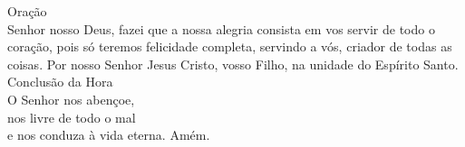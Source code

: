 \documentclass{book}
\begin{document}
\begin{center}
    \textcolor{VioletRed1}{Oração}
    \vspace{.2cm} \\
    Senhor nosso Deus, fazei que a nossa alegria consista em vos servir de todo o coração, pois só teremos felicidade completa, servindo a vós, criador de todas as coisas. Por nosso Senhor Jesus Cristo, vosso Filho, na unidade do Espírito Santo.
    \vspace{.2cm} \\
    \textcolor{VioletRed1}{Conclusão da Hora}
    \vspace{.2cm} \\
    O Senhor nos abençoe, \\
    nos livre de todo o mal \\
    e nos conduza à vida eterna. Amém.
\end{center}
\end{document}
